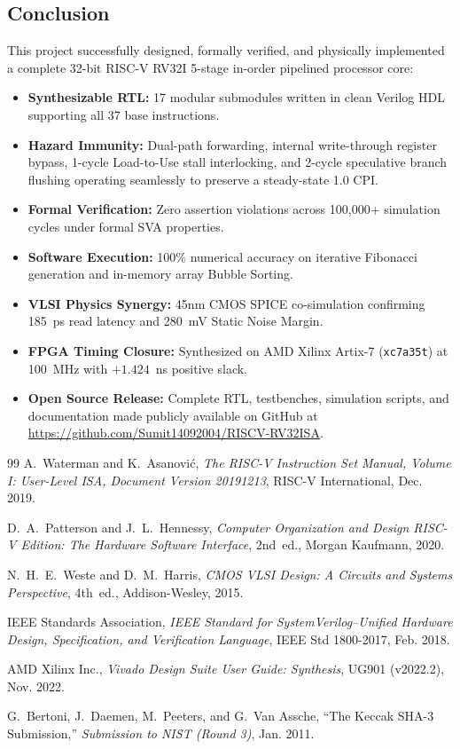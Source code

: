 \documentclass[10.5pt,a4paper]{article}
\begin{document}
\subsection{Conclusion}
This project successfully designed, formally verified, and physically implemented a complete 32-bit RISC-V RV32I 5-stage in-order pipelined processor core:
\begin{itemize}
  \setlength\itemsep{1pt}
  \item \textbf{Synthesizable RTL:} 17 modular submodules written in clean Verilog HDL supporting all 37 base instructions.
  \item \textbf{Hazard Immunity:} Dual-path forwarding, internal write-through register bypass, 1-cycle Load-to-Use stall interlocking, and 2-cycle speculative branch flushing operating seamlessly to preserve a steady-state 1.0 CPI.
  \item \textbf{Formal Verification:} Zero assertion violations across 100,000+ simulation cycles under formal SVA properties.
  \item \textbf{Software Execution:} 100\% numerical accuracy on iterative Fibonacci generation and in-memory array Bubble Sorting.
  \item \textbf{VLSI Physics Synergy:} 45nm CMOS SPICE co-simulation confirming 185~ps read latency and 280~mV Static Noise Margin.
  \item \textbf{FPGA Timing Closure:} Synthesized on AMD Xilinx Artix-7 (\texttt{xc7a35t}) at 100~MHz with $+1.424$~ns positive slack.
  \item \textbf{Open Source Release:} Complete RTL, testbenches, simulation scripts, and documentation made publicly available on GitHub at \url{https://github.com/Sumit14092004/RISCV-RV32ISA}.
\end{itemize}

\begin{thebibliography}{99}
A.~Waterman and K.~Asanovi\'{c}, \emph{The RISC-V Instruction Set Manual, Volume I: User-Level ISA, Document Version 20191213}, RISC-V International, Dec. 2019.

D.~A.~Patterson and J.~L.~Hennessy, \emph{Computer Organization and Design RISC-V Edition: The Hardware Software Interface}, 2nd~ed., Morgan Kaufmann, 2020.

N.~H.~E.~Weste and D.~M.~Harris, \emph{CMOS VLSI Design: A Circuits and Systems Perspective}, 4th~ed., Addison-Wesley, 2015.

IEEE Standards Association, \emph{IEEE Standard for SystemVerilog--Unified Hardware Design, Specification, and Verification Language}, IEEE Std 1800-2017, Feb. 2018.

AMD Xilinx Inc., \emph{Vivado Design Suite User Guide: Synthesis}, UG901 (v2022.2), Nov. 2022.

G.~Bertoni, J.~Daemen, M.~Peeters, and G.~Van Assche, ``The Keccak SHA-3 Submission,'' \emph{Submission to NIST (Round 3)}, Jan. 2011.
\end{thebibliography}
\end{document}
